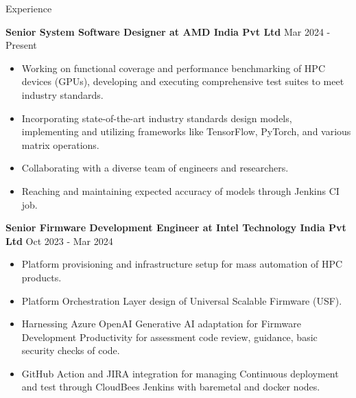 \documentclass{resume} %
\begin{document}

\begin{rSection}{Experience}

{\bf Senior System Software Designer at AMD India Pvt Ltd} \hfill {Mar 2024 - Present }
\begin{itemize}
    \item Working on functional coverage and performance benchmarking of HPC devices (GPUs), developing and executing comprehensive test suites to meet industry standards.
    \item Incorporating state-of-the-art industry standards design models, implementing and utilizing frameworks like TensorFlow, PyTorch, and various matrix operations.
    \item Collaborating with a diverse team of engineers and researchers.
    \item Reaching and maintaining expected accuracy of models through Jenkins CI job.
\end{itemize}

{\textbf{Senior Firmware Development Engineer at Intel Technology India Pvt Ltd}}  \hfill {Oct 2023 - Mar 2024}
\begin{itemize}
    \item Platform provisioning and infrastructure setup for mass automation of HPC products.
    \item Platform Orchestration Layer design of Universal Scalable Firmware (USF).
    \item Harnessing Azure OpenAI Generative AI adaptation for Firmware Development Productivity for assessment code review, guidance, basic security checks of code.
    \item GitHub Action and JIRA integration for managing Continuous deployment and test through CloudBees Jenkins with baremetal and docker nodes.
\end{itemize}


\end{rSection}
\end{document}
